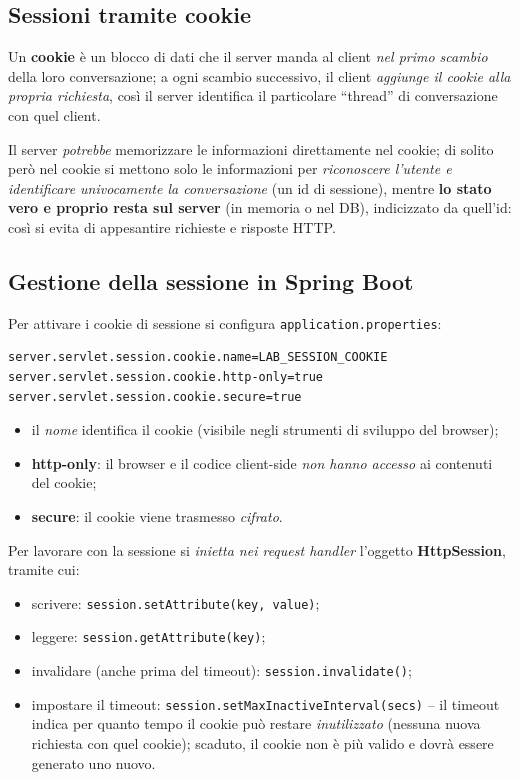 \subsection{Sessioni tramite cookie}
\begin{definizione}[Cookie]
Un \textbf{cookie} \`e un blocco di dati che il server manda al client \emph{nel primo
scambio} della loro conversazione; a ogni scambio successivo, il client \emph{aggiunge il
cookie alla propria richiesta}, cos\`i il server identifica il particolare ``thread'' di
conversazione con quel client.
\end{definizione}
Il server \emph{potrebbe} memorizzare le informazioni direttamente nel cookie; di solito
per\`o nel cookie si mettono solo le informazioni per \emph{riconoscere l'utente e
identificare univocamente la conversazione} (un id di sessione), mentre \textbf{lo stato vero
e proprio resta sul server} (in memoria o nel DB), indicizzato da quell'id: cos\`i si evita
di appesantire richieste e risposte HTTP.

\subsection{Gestione della sessione in Spring Boot}
Per attivare i cookie di sessione si configura \texttt{application.properties}:
\begin{lstlisting}
server.servlet.session.cookie.name=LAB_SESSION_COOKIE
server.servlet.session.cookie.http-only=true
server.servlet.session.cookie.secure=true
\end{lstlisting}
\begin{itemize}
  \item il \emph{nome} identifica il cookie (visibile negli strumenti di sviluppo del
        browser);
  \item \textbf{http-only}: il browser e il codice client-side \emph{non hanno accesso} ai
        contenuti del cookie;
  \item \textbf{secure}: il cookie viene trasmesso \emph{cifrato}.
\end{itemize}
Per lavorare con la sessione si \emph{inietta nei request handler} l'oggetto
\textbf{HttpSession}, tramite cui:
\begin{itemize}
  \item scrivere: \texttt{session.setAttribute(key, value)};
  \item leggere: \texttt{session.getAttribute(key)};
  \item invalidare (anche prima del timeout): \texttt{session.invalidate()};
  \item impostare il timeout: \texttt{session.setMaxInactiveInterval(secs)} -- il timeout
        indica per quanto tempo il cookie pu\`o restare \emph{inutilizzato} (nessuna nuova
        richiesta con quel cookie); scaduto, il cookie non \`e pi\`u valido e dovr\`a
        essere generato uno nuovo.
\end{itemize}

